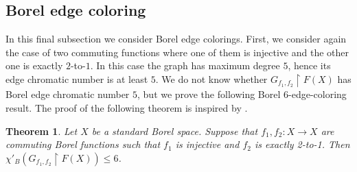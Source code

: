 \documentclass[11pt, reqno, a4paper]{amsart}
\newtheorem{theorem}{Theorem}[section]
\theoremstyle{definition}
\theoremstyle{plain}
\begin{document}
\subsection{Borel edge coloring}


In this final subsection we consider Borel edge colorings. First, we consider again the case of two commuting functions where one of them is injective and the other one is exactly $2$-to-$1$. In this case the graph has maximum degree $5$,  hence its
edge chromatic number is at least $5$. We do not know whether
$G_{f_1,f_2}\upharpoonright F(X)$ has Borel edge chromatic
number $5$, but we prove
the following Borel $6$-edge-coloring result. 
The proof of the following theorem is inspired by \cite{GaoWangWang2025ContinuousEdge}.

\begin{theorem}
\label{thm:color}
Let $X$ be a standard Borel space. Suppose that $f_1,f_2:X\to X$ are commuting Borel functions such that $f_1$ is injective and $f_2$ is exactly 2-to-1.
Then $\chi'_B(G_{f_1,f_2}\upharpoonright F(X))\leq 6$.
\end{theorem}
\end{document}
